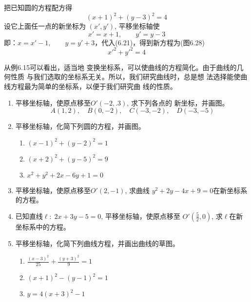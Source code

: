 \begin{solution}
    把已知圆的方程配方得
\begin{equation}
    (x+1)^2+(y-3)^2=4
\end{equation}
设它上面任一点的新坐标为
$(x',y')$, 平移坐标轴使
\[x'=x+1,\qquad y'=y-3\]
即：$x=x'-1,\qquad y=y'+3$，代入(6.21)，得到新方程为(图6.28)
\[{x'}^2+{y'}^2=4\]
\end{solution}

\begin{figure}[htp]
    \centering
{}
    \caption{}
\end{figure}


从例6.15可以看出，适当地
变换坐标系，可以使曲线的方程简化。由于曲线的几何性质
与我们选取的坐标系无关。所以，我们研究曲线时，总是想
法选择能使曲线方程最为简单的坐标系，以便于我们研究曲
线的性质。

\begin{ex}
\begin{enumerate}
    \item 平移坐标轴，使原点移至$O'(-2,.3)$, 求下列各点的
    新坐标，并画图。
\[    A(1,2),\quad B(0,-2),\quad  C(-3,-2),\quad D(-3,-5)\]
    \item 平移坐标轴，化简下列圆的方程，并画图。
\begin{enumerate}
    \item $(x-1)^2+(y-2)^2=1$
    \item $(x+2)^2+(y-5)^2=9$
    \item $x^2+y^2+2x-6y+1=0$
\end{enumerate}

    \item 平移坐标轴，使原点移至$O'(2,-1)$, 求曲线
    $y^2+2y-4x+9=0$在新坐标系的方程。
    \item 已知直线$\ell:\; 2x+3y-5=0$, 平移坐标轴，使原点移至
    $O'\left(\frac{5}{2},0\right)$, 
求$\ell$在新坐标系中的方程。
\item 平移坐标轴，化简下列曲线方程，并画出曲线的草图。
\begin{enumerate}
    \item $\frac{(x-3)^2}{25}+\frac{(y+3)^2}{9}=1$
    \item $(x+1)^2-(y-1)^2=1$
    \item $y=4(x+3)^2-1$
\end{enumerate}
\end{enumerate}
\end{ex}

